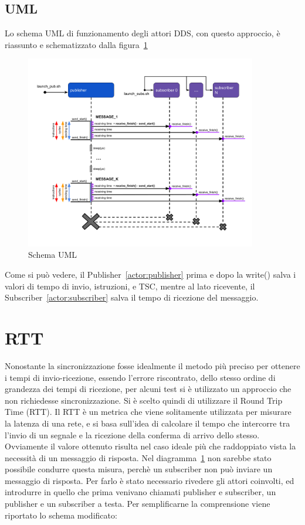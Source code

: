 \subsection*{UML}
Lo schema UML di funzionamento degli attori DDS, con questo approccio, è riassunto e schematizzato dalla figura~\ref{fig:uml}
\begin{figure}[H]
    \centering
    \includegraphics[width=0.9\textwidth]{./img/umel-send-receive.png}
    \caption{Schema UML}\label{fig:uml}
\end{figure}
Come si può vedere, il Publisher~\ref{actor:publisher} prima e dopo la write() salva i valori di tempo di invio, istruzioni, e TSC, mentre al lato ricevente, il Subscriber~\ref{actor:subscriber} salva il tempo di ricezione del messaggio.


\section{RTT}\label{sec:timeRTT}

Nonostante la sincronizzazione fosse idealmente il metodo più preciso per ottenere i tempi di invio-ricezione, essendo l'errore riscontrato, dello stesso ordine di grandezza dei tempi di ricezione, per alcuni test si è utilizzato un approccio che non richiedesse sincronizzazione. Si è scelto quindi di utilizzare il Round Trip Time (RTT).
Il RTT è un metrica che viene solitamente utilizzata per misurare la latenza di una rete, e si basa sull'idea di calcolare il tempo che intercorre tra l'invio di un segnale e la ricezione della conferma di arrivo dello stesso. Ovviamente il valore ottenuto risulta nel caso ideale più che raddoppiato vista la necessità di un messaggio di risposta. Nel diagramma~\ref{fig:uml} non sarebbe stato possibile condurre questa misura, perchè un subscriber non può inviare un messaggio di risposta.
Per farlo è stato necessario rivedere gli attori coinvolti, ed introdurre in quello che prima venivano chiamati publisher e subscriber, un publisher e un subscriber a testa.
Per semplificarne la comprensione viene riportato lo schema modificato:

